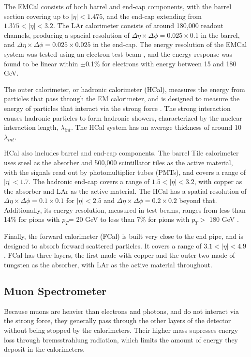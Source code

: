 The EMCal consists of both barrel and end-cap components, with the barrel section covering up to $|\eta|<1.475$, and the end-cap extending from $1.375<|\eta|<3.2$. The LAr calorimeter consists of around 180,000 readout channels, producing a spacial resolution of $\Delta\eta\times\Delta\phi = 0.025\times 0.1$ in the barrel, and $\Delta\eta\times\Delta\phi = 0.025\times 0.025$ in the end-cap. The energy resolution of the EMCal system was tested using an electron test-beam \cite{Aharrouche_2006}, and the energy response was found to be linear within $\pm$0.1\% for electrons with energy between 15 and 180 GeV. 

The outer calorimeter, or hadronic calorimeter (HCal), measures the energy from particles that pass through the EM calorimeter, and is designed to measure the energy of particles that interact via the strong force \cite{TCAL-2010-01}. The strong interaction causes hadronic particles to form hadronic showers, characterized by the nuclear interaction length, $\lambda_{int}$.
The HCal system has an average thickness of around 10 $\lambda_{int}$.
 
HCal also includes barrel and end-cap components. The barrel Tile calorimeter uses steel as the absorber and 500,000 scintillator tiles as the active material, with the signals read out by photomultiplier tubes (PMTs), and covers a range of $|\eta|<1.7$. The hadronic end-cap covers a range of $1.5<|\eta|<3.2$, with copper as the absorber and LAr as the active material. The HCal has a spatial resolution of $\Delta\eta\times\Delta\phi = 0.1\times 0.1$ for $|\eta|<2.5$ and $\Delta\eta\times\Delta\phi = 0.2\times 0.2$ beyond that. Additionally, its energy resolution, measured in test beams, ranges from less than 14\% for pions with $p_T$= 20 GeV to less than 7\% for pions with $p_T>$ 180 GeV \cite{Boumediene:2020cvu}.

Finally, the forward calorimeter (FCal) is built very close to the end pipe, and is designed to absorb forward scattered particles. It covers a range of $3.1<|\eta|<4.9$. FCal has three layers, the first made with copper and the outer two made of tungsten as the absorber, with LAr as the active material throughout. 

\subsection{Muon Spectrometer}
\label{sec:muonSpec}

Because muons are heavier than electrons and photons, and do not interact via the strong force, they generally pass through the other layers of the detector without being stopped by the calorimeters. Their higher mass supresses energy loss through bremsstrahlung radiation, which limits the amount of energy they deposit in the calorimeters. 

